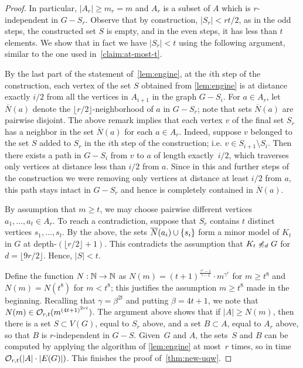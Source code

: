\begin{proof}
In particular,  $|A_r|\ge m_r=m$ and $A_r$ is a subset of $A$ which is $r$-independent in $G-S_r$.
Observe that by construction, $|S_r|<r t/2$, as in the odd steps, the constructed set $S$ is empty, and in the even steps, it has less than $t$ elements. 
We show that in fact we have $|S_r|<t$ using the following argument, similar to the one used in~\cref{claim:at-most-t}.

By the last part of the statement of~\cref{lem:engine},  at the $i$th step of the construction, each vertex of the set $S$ obtained from \cref{lem:engine}
is at distance exactly $i/2$ from all the vertices in $A_{i+1}$ in the graph 
$G-S_i$. 
For $a\in A_r$, let $\overline{N}(a)$ denote the $\lfloor r/2\rfloor$-neighborhood of $a$ in $G-S_r$; note that sets $\overline{N}(a)$ are pairwise disjoint.
The above remark implies that each vertex $v$ of the final set $S_r$ has a neighbor in the set $\overline{N}(a)$ for each $a\in A_r$.
Indeed, suppose $v$ belonged to the set $S$ added to $S_r$ in the $i$th step of the construction; i.e. $v\in S_{i+1}\setminus S_i$.
Then there exists a path in $G-S_i$ from $v$ to $a$ of length exactly~$i/2$, which traverses only vertices at distance less than $i/2$ from $a$.
Since in this and further steps of the construction we were removing only vertices at distance at least $i/2$ from $a$, this path stays intact in $G-S_r$ and hence is completely contained in $\overline{N}(a)$.

By assumption that $m\ge t$, we may choose pairwise different vertices $a_1,\ldots,a_t\in A_r$.
To reach a contradiction, suppose that $S_r$ contains $t$ distinct vertices $s_1,\ldots,s_t$. 
By the above, the sets $\overline{N}(a_i)\cup\{s_i\}$ 
form a minor model of $K_t$ in $G$ at depth-$(\lfloor r/2\rfloor+1)$.
This contradicts the assumption that $K_t\not\preccurlyeq_d G$ for $d=\lfloor 9r/2 \rfloor$.
Hence, $|S|<t$.

Define the function  $N:\mathbb{N}\to\mathbb{N}$
as $N(m)=(t+1)^{\frac{\gamma^{r}-1}{\gamma-1}}\cdot m^{\gamma^{r}}$
for $m\ge t^8$ and $N(m)=N(t^8)$ for $m<t^8$; this justifies the assumption $m\geq t^8$ made in the beginning.
Recalling that $\gamma=\beta^{2t}$ and putting $\beta=4t+1$, we
note that $N(m)\in \mathcal{O}_{r,t}{(m^{{(4t+1)}^{2rt}})}$.
The argument above shows that if $|A|\ge N(m)$, then 
there is a set $S\subset V(G)$, equal to $S_r$ above,
and a set $B\subset A$, equal to $A_r$ above,
so that $B$ is $r$-independent in $G-S$.
Given~$G$ and $A$, the sets~$S$ and $B$ can be computed by applying the algorithm of \cref{lem:engine} at most~$r$ times, so in time $\mathcal{O}_{r,t}(|A|\cdot |E(G)|)$.
This finishes the proof of~\cref{thm:new-uqw}.
\end{proof}



